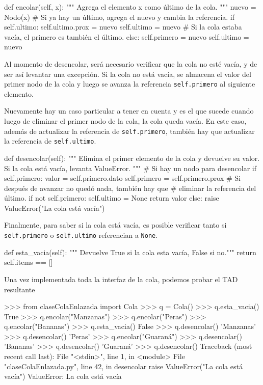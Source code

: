 \begin{codigo-python-sn}
    def encolar(self, x):
        """ Agrega el elemento x como último de la cola. """
        nuevo = Nodo(x)
        # Si ya hay un último, agrega el nuevo y cambia la referencia.
        if self.ultimo:
            self.ultimo.prox = nuevo
            self.ultimo = nuevo
        # Si la cola estaba vacía, el primero es también el último.
        else:
            self.primero = nuevo
            self.ultimo = nuevo
\end{codigo-python-sn}

Al momento de desencolar, será necesario verificar que la cola no esté
vacía, y de ser así levantar una excepción.  Si la cola no está vacía,
se almacena el valor del primer nodo de la cola y luego se avanza la
referencia \lstinline!self.primero! al siguiente elemento.

Nuevamente hay un caso particular a tener en cuenta y es el que sucede
cuando luego de eliminar el primer nodo de la cola, la cola queda vacía.
En este caso, además de actualizar la referencia de
\lstinline!self.primero!, también hay que actualizar la referencia de
\lstinline!self.ultimo!.

\begin{codigo-python-sn}
    def desencolar(self):
        """ Elimina el primer elemento de la cola y devuelve su
            valor. Si la cola está vacía, levanta ValueError. """
        # Si hay un nodo para desencolar
        if self.primero:
            valor = self.primero.dato
            self.primero = self.primero.prox
            # Si después de avanzar no quedó nada, también hay que
            # eliminar la referencia del último.
            if not self.primero:
                self.ultimo = None
            return valor
        else:
            raise ValueError("La cola está vacía")
\end{codigo-python-sn}

Finalmente, para saber si la cola está vacía, es posible verificar tanto si
\lstinline!self.primero! o \lstinline!self.ultimo! referencian a
\lstinline!None!.

\begin{codigo-python-sn}
    def esta_vacia(self):
        """ Devuelve True si la cola esta vacía, False si no."""
        return self.items == []
\end{codigo-python-sn}

Una vez implementada toda la interfaz de la cola, podemos probar el TAD
resultante

\begin{codigo-python-sn}
>>> from claseColaEnlazada import Cola
>>> q = Cola()
>>> q.esta_vacia()
True
>>> q.encolar("Manzanas")
>>> q.encolar("Peras")
>>> q.encolar("Bananas")
>>> q.esta_vacia()
False
>>> q.desencolar()
'Manzanas'
>>> q.desencolar()
'Peras'
>>> q.encolar("Guaraná")
>>> q.desencolar()
'Bananas'
>>> q.desencolar()
'Guaraná'
>>> q.desencolar()
Traceback (most recent call last):
  File "<stdin>", line 1, in <module>
  File "claseColaEnlazada.py", line 42, in desencolar
    raise ValueError("La cola está vacía")
ValueError: La cola está vacía
\end{codigo-python-sn}

